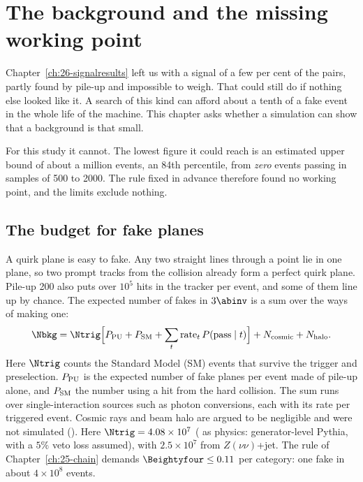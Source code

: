\chapter{The background and the missing working point}\label{ch:27-backgroundresults}

Chapter~\ref{ch:26-signalresults} left us with a signal of a few per cent of the pairs, partly found by pile-up and impossible to weigh. That
could still do if nothing else looked like it. A search of this kind can afford about a tenth of a fake event in the whole life of the
machine. This chapter asks whether a simulation can show that a background is that small.

For this study it cannot. The lowest figure it could reach is an estimated upper bound of about a million events, an 84th percentile, from
\emph{zero} events passing in samples of 500 to 2000. The rule fixed in advance therefore found no working point, and the
limits exclude nothing.

\section{The budget for fake planes}\label{sec:27-budget}

A quirk plane is easy to fake. Any two straight lines through a point lie in one plane, so two prompt tracks from the collision
already form a perfect quirk plane. Pile-up 200 also puts over $10^5$ hits in the tracker per event, and some of them line up by chance.
The expected number of fakes in $3\abinv$ is a sum over the ways of making one:
\begin{equation}
  \Nbkg=\Ntrig\Big[P_{\rm PU}+P_{\rm SM}+\sum_t{\rm rate}_t\,P({\rm pass}\mid t)\Big]+N_{\rm cosmic}+N_{\rm halo}.
  \label{eq:27-sum}
\end{equation}
Here $\Ntrig$ counts the Standard Model (SM) events that survive the trigger and preselection. $P_{\rm PU}$ is the expected number of fake planes
per event made of pile-up alone, and $P_{\rm SM}$ the number using a hit from the hard collision. The sum runs over single-interaction
sources such as photon conversions, each with its rate per triggered event. Cosmic rays and beam halo are argued to be negligible and were not simulated
(\EST). Here $\Ntrig=4.08\times10^7$ (\EST{} as physics: generator-level Pythia, with a $5\%$ veto loss assumed), with $2.5\times10^7$ from $Z(\nu\nu)$+jet. The rule
of Chapter~\ref{ch:25-chain} demands $\Beightyfour\le0.11$ per category: one fake in about $4\times10^8$ events.

